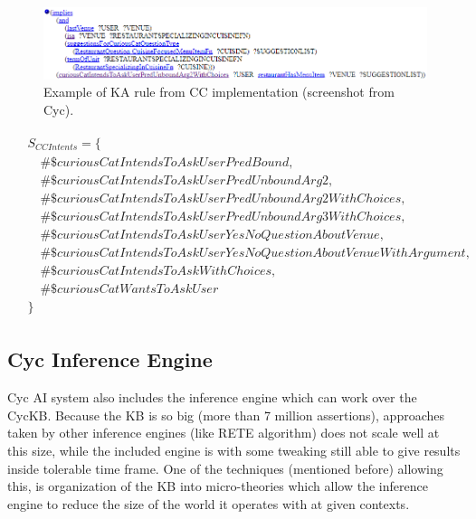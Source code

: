 \begin{figure}[h]
	\centering
		\includegraphics[width=1\textwidth]{figures/kaRule.png}
	\caption{Example of KA rule from CC implementation (screenshot from Cyc).}
	\label{fig:kaRuleImpl}
\end{figure}

\begin{equation}\label{as:cycCCAssertions}
\begin{gathered}
\begin{aligned}
&S_{CC Intents}=\{\\
&\quad\#\$curiousCatIntendsToAskUserPredBound,\\
&\quad\#\$curiousCatIntendsToAskUserPredUnboundArg2,\\
&\quad\#\$curiousCatIntendsToAskUserPredUnboundArg2WithChoices,\\
&\quad\#\$curiousCatIntendsToAskUserPredUnboundArg3WithChoices,\\
&\quad\#\$curiousCatIntendsToAskUserYesNoQuestionAboutVenue,\\
&\quad\#\$curiousCatIntendsToAskUserYesNoQuestionAboutVenueWithArgument,\\
&\quad\#\$curiousCatIntendsToAskWithChoices,\\
&\quad\#\$curiousCatWantsToAskUser\\
&\}
\end{aligned}
\end{gathered}
\end{equation}

\subsection{Cyc Inference Engine}
\label{section:cycinference}
Cyc AI system also includes the inference engine which can work over the CycKB.
Because the KB is so big (more than 7 million assertions), approaches taken
by other inference engines (like RETE algorithm) does not scale well at this
size, while the included engine is with some tweaking still able to give 
results inside tolerable time frame. One of the techniques (mentioned before)
allowing this, is organization of the KB into micro-theories which allow the 
inference engine to reduce the size of the world it operates with at given
contexts.

